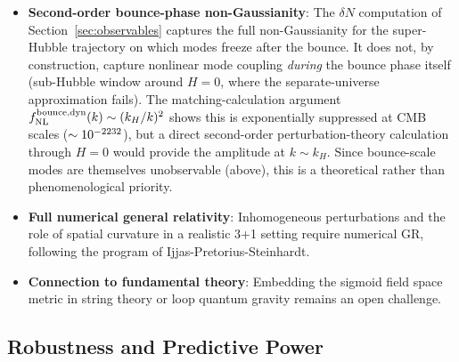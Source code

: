 \documentclass[11pt,a4paper]{article}
\begin{document}
\begin{itemize}
\item \textbf{Second-order bounce-phase non-Gaussianity}: The $\delta N$ computation of Section~\ref{sec:observables} captures the full non-Gaussianity for the super-Hubble trajectory on which modes freeze after the bounce. It does not, by construction, capture nonlinear mode coupling \emph{during} the bounce phase itself (sub-Hubble window around $H = 0$, where the separate-universe approximation fails). The matching-calculation argument $f_{\rm NL}^{\rm bounce,dyn}(k) \sim (k_H/k)^2$ \cite{Deruelle1995} shows this is exponentially suppressed at CMB scales ($\sim 10^{-2232}$), but a direct second-order perturbation-theory calculation through $H = 0$ would provide the amplitude at $k \sim k_H$. Since bounce-scale modes are themselves unobservable (above), this is a theoretical rather than phenomenological priority.
\item \textbf{Full numerical general relativity}: Inhomogeneous perturbations and the role of spatial curvature in a realistic 3+1 setting require numerical GR, following the program of Ijjas-Pretorius-Steinhardt.
\item \textbf{Connection to fundamental theory}: Embedding the sigmoid field space metric in string theory or loop quantum gravity remains an open challenge.
\end{itemize}

\subsection{Robustness and Predictive Power}
\end{document}
